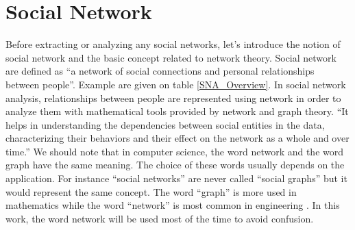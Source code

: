 \documentclass[a4paper, 12pt]{report}
\begin{document}
\chapter{Social Network}
 Before extracting or analyzing any social networks, let's introduce the notion of social network and the basic concept related to network theory.
Social network are defined as ``a network of social connections and personal relationships between people''. Example are given on table \ref{SNA_Overview}.
 In social network analysis, relationships between people are represented using network in order to analyze them with mathematical tools provided by network 
and graph theory. ``It helps in understanding the
dependencies between social entities in the data, characterizing
their behaviors and their effect on the network as
a whole and over time.'' \citep{SNA_Overview}
We should note that in computer science, the word network and the word graph have the same meaning. The choice of these words usually depends on the application. For instance ``social networks'' are never called  ``social graphs'' 
but it would represent the same concept. The word ``graph'' is more used in mathematics while the word ``network'' is most common in engineering \citep{network_theory}. In this work, the word network will be used most of the time to avoid confusion.

\begin{table}
\center
{}
\caption{Example of social networks \citep{SNA_Overview}}\label{SNA_Exemple}
\end{table}
\end{document}
